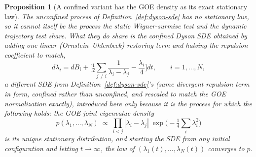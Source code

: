 \documentclass[11pt]{article}
\newtheorem{proposition}{Proposition}
\begin{document}
\begin{proposition}[A confined variant has the GOE density as its exact stationary law]
\label{prop:stationary}
The unconfined process of Definition~\ref{def:dyson-sde} has no
stationary law, so it cannot itself be the process the static
Wigner-surmise test and the dynamic trajectory test share. What they do
share is the confined Dyson SDE obtained by adding one linear
(Ornstein--Uhlenbeck) restoring term and halving the repulsion
coefficient to match,
\[
d\lambda_i = dB_i + \Big[\tfrac12\sum_{j\neq i}\frac{1}{\lambda_i-\lambda_j} - \frac{\lambda_i}{4}\Big]dt,
\qquad i=1,\dots,N,
\]
a different SDE from Definition~\ref{def:dyson-sde}'s (same
divergent repulsion term in form, confined rather than unconfined, and
rescaled to match the GOE normalization exactly), introduced here only
because it is the process for which the following holds: the GOE joint
eigenvalue density
\[
p(\lambda_1,\dots,\lambda_N) \;\propto\; \prod_{i<j}|\lambda_i-\lambda_j|
\;\exp\!\Big(-\tfrac14\sum_i \lambda_i^2\Big)
\]
is its unique stationary distribution, and starting the SDE from any
initial configuration and letting $t\to\infty$, the law of
$(\lambda_1(t),\dots,\lambda_N(t))$ converges to $p$.
\end{proposition}
\end{document}
